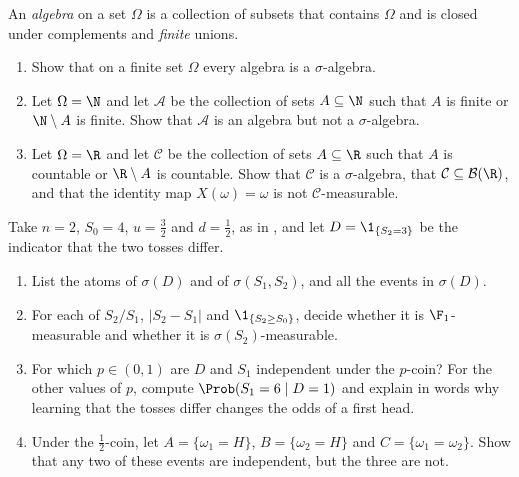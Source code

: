 
\begin{exercise}\label{ex:pr-algebras}
\easy An \emph{algebra} on a set $\Omega$ is a collection of subsets that contains $\Omega$
and is closed under complements and \emph{finite} unions.
\begin{enumerate}[label=(\alph*)]
  \item Show that on a finite set $\Omega$ every algebra is a $\sigma$-algebra.
  \item Let $\Omega=\N$ and let $\mathcal A$ be the collection of sets $A\subseteq\N$ such that
    $A$ is finite or $\N\setminus A$ is finite. Show that $\mathcal A$ is an algebra but not a
    $\sigma$-algebra.
  \item Let $\Omega=\R$ and let $\mathcal C$ be the collection of sets $A\subseteq\R$ such that
    $A$ is countable or $\R\setminus A$ is countable. Show that $\mathcal C$ is a
    $\sigma$-algebra, that $\mathcal C\subseteq\mathcal B(\R)$, and that the identity map
    $X(\omega)=\omega$ is not $\mathcal C$-measurable.
\end{enumerate}
\end{exercise}

\begin{exercise}\label{ex:pr-two-tosses}
\easy Take $n=2$, $S_0=4$, $u=\frac32$ and $d=\frac12$, as in , and
let $D=\1_{\{S_2=3\}}$ be the indicator that the two tosses differ.
\begin{enumerate}[label=(\alph*)]
  \item List the atoms of $\sigma(D)$ and of $\sigma(S_1,S_2)$, and all the events in
    $\sigma(D)$.
  \item For each of $S_2/S_1$, $|S_2-S_1|$ and $\1_{\{S_2\ge S_0\}}$, decide whether it is
    $\F_1$-measurable and whether it is $\sigma(S_2)$-measurable.
  \item For which $p\in(0,1)$ are $D$ and $S_1$ independent under the $p$-coin? For the other
    values of $p$, compute $\Prob(S_1=6\mid D=1)$ and explain in words why learning that the
    tosses differ changes the odds of a first head.
  \item Under the $\frac12$-coin, let $A=\{\omega_1=H\}$, $B=\{\omega_2=H\}$ and
    $C=\{\omega_1=\omega_2\}$. Show that any two of these events are independent, but the
    three are not.
\end{enumerate}
\end{exercise}

